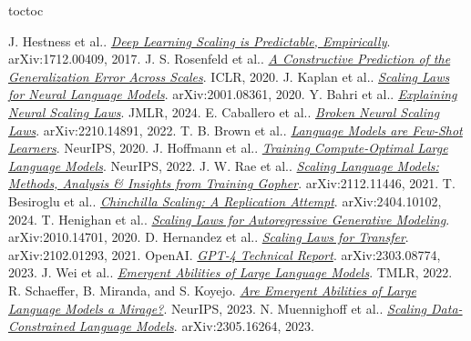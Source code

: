 \documentclass[UTF8,10pt,a4paper,fontset=none]{ctexart}
\let\BilingualOriginalAddContentsLine\addcontentsline
\def\BilingualTocExtension{entoc}
\renewcommand{\addcontentsline}[3]{%
  \def\BilingualRequestedExtension{#1}%
  \def\BilingualStandardToc{toc}%
  \ifx\BilingualRequestedExtension\BilingualStandardToc
    \BilingualOriginalAddContentsLine{\BilingualTocExtension}{#2}{#3}%
  \else
    \BilingualOriginalAddContentsLine{#1}{#2}{#3}%
  \fi
}
\begin{document}
\clearpage
{}
{}
\begin{thebibliography}{99}
\small
\setlength{\itemsep}{1pt}
\setlength{\parskip}{0pt}
\newcommand{\bibentry}[5]{#1. \href{#5}{\textit{#2}}. #3, #4.}

 \bibentry{J. Hestness et al.}{Deep Learning Scaling is Predictable, Empirically}{arXiv:1712.00409}{2017}{https://arxiv.org/abs/1712.00409}
 \bibentry{J. S. Rosenfeld et al.}{A Constructive Prediction of the Generalization Error Across Scales}{ICLR}{2020}{https://arxiv.org/abs/1909.12673}
 \bibentry{J. Kaplan et al.}{Scaling Laws for Neural Language Models}{arXiv:2001.08361}{2020}{https://arxiv.org/abs/2001.08361}
 \bibentry{Y. Bahri et al.}{Explaining Neural Scaling Laws}{JMLR}{2024}{https://arxiv.org/abs/2102.06701}
 \bibentry{E. Caballero et al.}{Broken Neural Scaling Laws}{arXiv:2210.14891}{2022}{https://arxiv.org/abs/2210.14891}
 \bibentry{T. B. Brown et al.}{Language Models are Few-Shot Learners}{NeurIPS}{2020}{https://arxiv.org/abs/2005.14165}
 \bibentry{J. Hoffmann et al.}{Training Compute-Optimal Large Language Models}{NeurIPS}{2022}{https://doi.org/10.48550/arXiv.2203.15556}
 \bibentry{J. W. Rae et al.}{Scaling Language Models: Methods, Analysis \& Insights from Training Gopher}{arXiv:2112.11446}{2021}{https://arxiv.org/abs/2112.11446}
 \bibentry{T. Besiroglu et al.}{Chinchilla Scaling: A Replication Attempt}{arXiv:2404.10102}{2024}{https://arxiv.org/abs/2404.10102}
 \bibentry{T. Henighan et al.}{Scaling Laws for Autoregressive Generative Modeling}{arXiv:2010.14701}{2020}{https://arxiv.org/abs/2010.14701}
 \bibentry{D. Hernandez et al.}{Scaling Laws for Transfer}{arXiv:2102.01293}{2021}{https://arxiv.org/abs/2102.01293}
 \bibentry{OpenAI}{GPT-4 Technical Report}{arXiv:2303.08774}{2023}{https://arxiv.org/abs/2303.08774}
 \bibentry{J. Wei et al.}{Emergent Abilities of Large Language Models}{TMLR}{2022}{https://arxiv.org/abs/2206.07682}
 \bibentry{R. Schaeffer, B. Miranda, and S. Koyejo}{Are Emergent Abilities of Large Language Models a Mirage?}{NeurIPS}{2023}{https://arxiv.org/abs/2304.15004}
 \bibentry{N. Muennighoff et al.}{Scaling Data-Constrained Language Models}{arXiv:2305.16264}{2023}{https://arxiv.org/abs/2305.16264}

\end{thebibliography}
\end{document}
